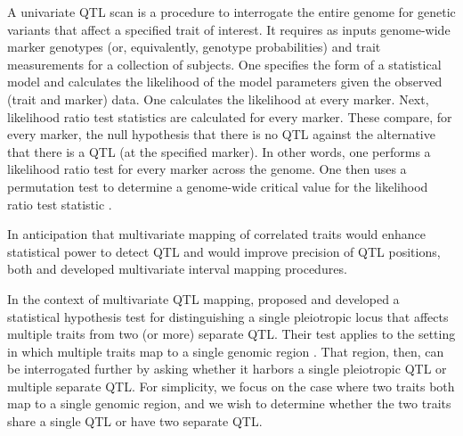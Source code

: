 \documentclass[]{article}
\begin{document}

A univariate QTL scan is a procedure to interrogate the entire genome for genetic
variants that affect a specified trait of interest.
It requires as inputs genome-wide marker genotypes (or, equivalently,
genotype probabilities) and trait measurements for a collection of subjects.
One specifies the form of a statistical model and calculates the
likelihood of the model parameters given the observed (trait and marker) data. 
One calculates the likelihood at every marker.
Next, likelihood ratio test statistics are calculated for every marker.
These compare, for every marker, the null hypothesis that there is no 
QTL against the alternative that there is a QTL (at the specified marker).
In other words, one performs a likelihood ratio test for every marker across the genome.
One then uses a permutation test to determine a genome-wide critical value
for the likelihood ratio test statistic \citep{churchill1994empirical}. 















In anticipation that multivariate mapping of correlated traits would enhance statistical power to detect QTL and would improve precision of QTL positions, both \citet{jiang1995multiple} and \citet{korol1995interval} developed multivariate interval mapping procedures. 


In the context of multivariate QTL mapping, \citet{jiang1995multiple} 
proposed and developed a statistical hypothesis test for distinguishing
a single pleiotropic locus that affects multiple traits from two (or more)
separate QTL.
Their test applies to the setting in which multiple traits
map to a single genomic region \citep{jiang1995multiple}. 
That region, then, can be interrogated further by asking whether it
harbors a single pleiotropic QTL or multiple separate QTL. For simplicity, we focus on the case where two traits both map to a single genomic region, and we wish to determine whether the two traits share a single QTL or have two separate QTL. 
\end{document}
